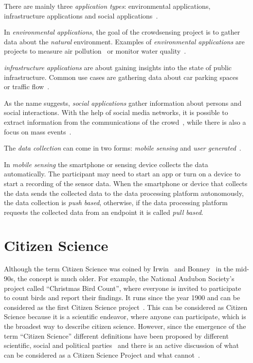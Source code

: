 There are mainly three \textit{application types}: environmental applications, infrastructure applications and social applications~\cite{ganti2011mobile}.

In \textit{environmental applications}, the goal of the crowdsensing project is to gather data about the \textit{natural} environment.
Examples of \textit{environmental applications} are projects to measure air pollution~\cite{hasenfratz2012participatory,sivaraman2013hazewatch,liu2018third} or monitor water quality~\cite{minkman2015citizen,rapousis2016performance,shang2023crowdwatersens}.

\textit{infrastructure applications} are about gaining insights into the state of public infrastructure.
Common use cases are gathering data about car parking spaces~\cite{villanueva2015crowdsensing,coric2013crowdsensing,rinne2014mobile} or traffic flow~\cite{wang2018city,li2019privacy,mei2020towards}.

As the name suggests, \textit{social applications} gather information about persons and social interactions.
With the help of social media networks, it is possible to extract information from the communications of the crowd~\cite{grasso2017public,cecilia2020mobile,phan2019drinks}, while there is also a focus on mass events~\cite{rahman2017location,cardone2014crowdsensing,jarvis2013ubicomp}.

The \textit{data collection} can come in two forms: \textit{mobile sensing} and \textit{user generated}~\cite{pietschmann2008croco}.

In \textit{mobile sensing} the smartphone or sensing device collects the data automatically.
The participant may need to start an app or turn on a device to start a recording of the sensor data.
When the smartphone or device that collects the data sends the collected data to the data processing platform autonomously, the data collection is \textit{push based}, otherwise, if the data processing platform requests the collected data from an endpoint it is called \textit{pull based}. 

\section{Citizen Science}
\label{sec:citizen_science_background}
Although the term Citizen Science was coined by Irwin~\cite{irwin1995citizen} and Bonney~\cite{bonney1996citizen} in the mid-90s, the concept is much older.
For example, the National Audubon Society's project called ``Christmas Bird Count'', where everyone is invited to participate to count birds and report their findings.
It runs since the year 1900 and can be considered as the first Citizen Science project~\cite{silvertown2009new}.
This can be considered as Citizen Science because it is a scientific endeavor, where anyone can participate, which is the broadest way to describe citizen science.
However, since the emergence of the term ``Citizen Science'' different definitions have been proposed by different scientific, social and political parties~\cite{heigl2019toward,ecsa2015ten,us2016crowdsourcing} and there is an active discussion of what can be considered as a Citizen Science Project and what cannot~\cite{haklay2021citizen}. 

